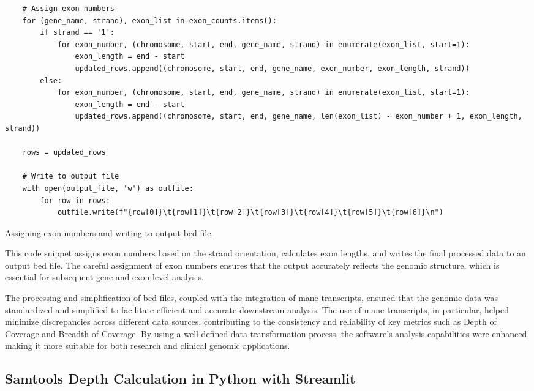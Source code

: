 \begin{longlisting}
\begin{verbatim}
    # Assign exon numbers
    for (gene_name, strand), exon_list in exon_counts.items():
        if strand == '1':
            for exon_number, (chromosome, start, end, gene_name, strand) in enumerate(exon_list, start=1):
                exon_length = end - start
                updated_rows.append((chromosome, start, end, gene_name, exon_number, exon_length, strand))
        else:
            for exon_number, (chromosome, start, end, gene_name, strand) in enumerate(exon_list, start=1):
                exon_length = end - start
                updated_rows.append((chromosome, start, end, gene_name, len(exon_list) - exon_number + 1, exon_length, strand))

    rows = updated_rows

    # Write to output file
    with open(output_file, 'w') as outfile:
        for row in rows:
            outfile.write(f"{row[0]}\t{row[1]}\t{row[2]}\t{row[3]}\t{row[4]}\t{row[5]}\t{row[6]}\n")
\end{verbatim}
\caption{Assigning exon numbers and writing to output \ac{bed} file.}
\label{lbl:assign_exons_script}
\end{longlisting}

This code snippet assigns exon numbers based on the strand orientation, calculates exon lengths, and writes the final processed data to an output \ac{bed} file. The careful assignment of exon numbers ensures that the output accurately reflects the genomic structure, which is essential for subsequent gene and exon-level analysis.

The processing and simplification of \ac{bed} files, coupled with the integration of \ac{mane} transcripts, ensured that the genomic data was standardized and simplified to facilitate efficient and accurate downstream analysis. The use of \ac{mane} transcripts, in particular, helped minimize discrepancies across different data sources, contributing to the consistency and reliability of key metrics such as Depth of Coverage and Breadth of Coverage. By using a well-defined data transformation process, the software's analysis capabilities were enhanced, making it more suitable for both research and clinical genomic applications.

\subsection{Samtools Depth Calculation in Python with Streamlit}

